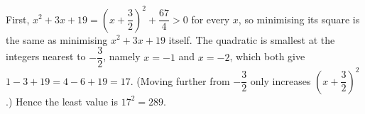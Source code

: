 First, $x^2+3x+19=\left(x+\dfrac{3}{2}\right)^2+\dfrac{67}{4}>0$ for every $x$, so minimising its square is the same as minimising $x^2+3x+19$ itself. The quadratic is smallest at the integers nearest to $-\dfrac{3}{2}$, namely $x=-1$ and $x=-2$, which both give $1-3+19=4-6+19=17$. (Moving further from $-\dfrac{3}{2}$ only increases $\left(x+\dfrac{3}{2}\right)^2$.) Hence the least value is $17^2=\boxed{289}$.
